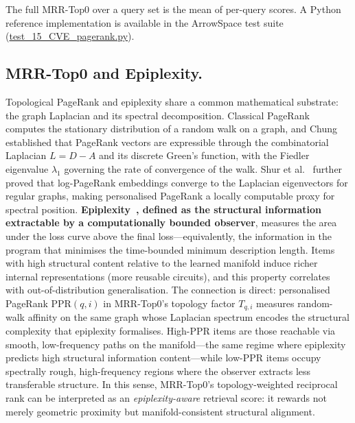 \documentclass[11pt,a4paper]{article}
\begin{document}
The full MRR-Top0 over a query set is the mean of per-query scores.  A
Python reference implementation is available in the ArrowSpace test suite
(\href{https://github.com/tuned-org-uk/pyarrowspace/blob/c3d9a40e00a04fa05660f76eb982793e2e80e773/tests/test_15_CVE_pagerank.py}{test\_15\_CVE\_pagerank.py}).

\subsection{MRR-Top0 and Epiplexity.}
Topological PageRank and epiplexity share a common mathematical substrate: 
the graph Laplacian and its spectral decomposition. Classical PageRank 
computes the stationary distribution of a random walk on a graph, and 
Chung~\cite{chung2010pagerank} established that PageRank vectors are 
expressible through the combinatorial Laplacian $L = D - A$ and its 
discrete Green's function, with the Fiedler eigenvalue $\lambda_1$ 
governing the rate of convergence of the walk. Shur et 
al.~\cite{shur2023pagerank} further proved that log-PageRank embeddings 
converge to the Laplacian eigenvectors for regular graphs, making 
personalised PageRank a locally computable proxy for spectral position. 
\textbf{Epiplexity~\cite{finzi2026epiplexity}, defined as the structural 
information extractable by a computationally bounded observer}, measures 
the area under the loss curve above the final loss---equivalently, the 
information in the program that minimises the time-bounded minimum 
description length. Items with high structural content relative to the 
learned manifold induce richer internal representations (more reusable 
circuits), and this property correlates with out-of-distribution 
generalisation. The connection is direct: personalised PageRank 
$\mathrm{PPR}(q, i)$ in MRR-Top0's topology factor $T_{q,i}$ measures 
random-walk affinity on the same graph whose Laplacian spectrum encodes 
the structural complexity that epiplexity formalises. High-PPR items are 
those reachable via smooth, low-frequency paths on the manifold---the 
same regime where epiplexity predicts high structural information 
content---while low-PPR items occupy spectrally rough, high-frequency 
regions where the observer extracts less transferable structure. In this 
sense, MRR-Top0's topology-weighted reciprocal rank can be interpreted 
as an \emph{epiplexity-aware} retrieval score: it rewards not merely 
geometric proximity but manifold-consistent structural alignment.
\end{document}
